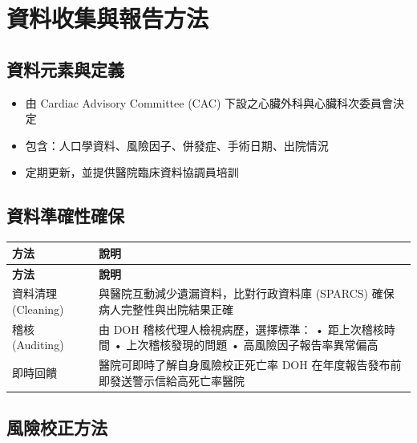 \documentclass[12pt,a4paper]{article}
\begin{document}
\section{資料收集與報告方法}

\subsection{資料元素與定義}

\begin{itemize}
    \item 由 Cardiac Advisory Committee (CAC) 下設之心臟外科與心臟科次委員會決定
    \item 包含：人口學資料、風險因子、併發症、手術日期、出院情況
    \item 定期更新，並提供醫院臨床資料協調員培訓
\end{itemize}

\subsection{資料準確性確保}

\begin{longtable}{p{3.5cm}p{10.5cm}}
\toprule
\textbf{方法} & \textbf{說明} \\
\midrule
\endfirsthead

\toprule
\textbf{方法} & \textbf{說明} \\
\midrule
\endhead

\bottomrule
\endfoot

資料清理 (Cleaning) & 與醫院互動減少遺漏資料，比對行政資料庫 (SPARCS) 確保病人完整性與出院結果正確 \\
\midrule
稽核 (Auditing) & 由 DOH 稽核代理人檢視病歷，選擇標準：\newline
• 距上次稽核時間\newline
• 上次稽核發現的問題\newline
• 高風險因子報告率異常偏高 \\
\midrule
即時回饋 & 醫院可即時了解自身風險校正死亡率\newline
DOH 在年度報告發布前即發送警示信給高死亡率醫院 \\
\bottomrule
\end{longtable}

\subsection{風險校正方法}
\end{document}
